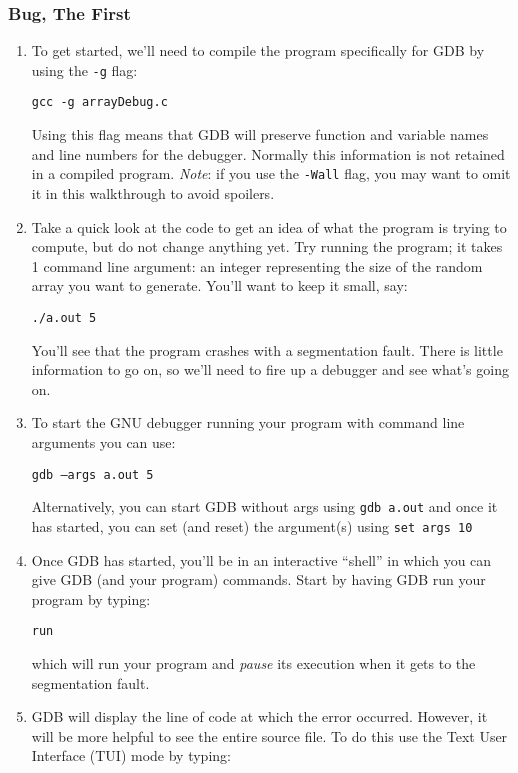 \documentclass[12pt]{scrartcl}
\begin{document}
\subsubsection*{Bug, The First}

\begin{enumerate}
  \item To get started, we'll need to compile the program specifically for GDB
  by using the \texttt{-g} flag:

  \texttt{gcc -g arrayDebug.c}

  Using this flag means that GDB will preserve function and variable names
  and line numbers for the debugger.  Normally this information is not 
  retained in a compiled program.  \emph{Note}: if you use the 
  \texttt{-Wall} flag, you may want to omit it in this walkthrough
  to avoid spoilers.
  
  \item Take a quick look at the code to get an idea of what the program
  is trying to compute, but do not change anything yet.  Try running the 
  program; it takes 1 command line argument: an integer
  representing the size of the random array you want to generate.  You'll
  want to keep it small, say: 
  
  \texttt{./a.out 5}

  You'll see that the program crashes with a segmentation fault.  There is
  little information to go on, so we'll need to fire up a debugger and see
  what's going on.
  
  \item To start the GNU debugger running your program with command line arguments
  you can use:
  
  \texttt{gdb --args a.out 5}
  
  Alternatively, you can start GDB without args using \texttt{gdb a.out}
  and once it has started, you can set (and reset) the argument(s) using 
  \texttt{set args 10}

  \item Once GDB has started, you'll be in an interactive ``shell'' in which
  you can give GDB (and your program) commands.  Start by having GDB run your
  program by typing: 
  
  \texttt{run}
  
  which will run your program and \emph{pause} its execution when it gets to the
  segmentation fault.  
  
  \item GDB will display the line of code at which the error occurred.
  However, it will be more helpful to see the entire source file.  To do
  this use the Text User Interface (TUI) mode by typing:
  

\end{enumerate}
\end{document}
